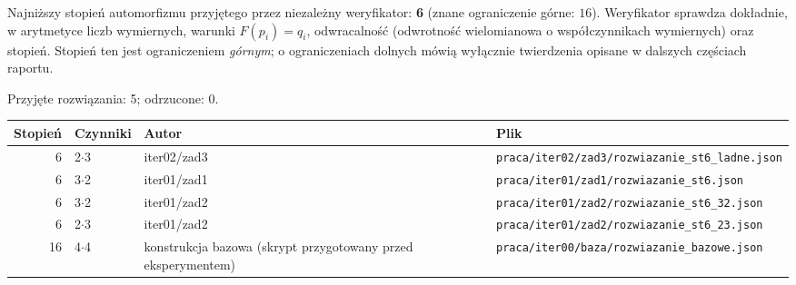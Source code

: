 Najniższy stopień automorfizmu przyjętego przez niezależny weryfikator: \textbf{6} (znane ograniczenie górne: $16$). Weryfikator sprawdza dokładnie, w arytmetyce liczb wymiernych, warunki $F(p_i)=q_i$, odwracalność (odwrotność wielomianowa o współczynnikach wymiernych) oraz stopień. Stopień ten jest ograniczeniem \emph{górnym}; o ograniczeniach dolnych mówią wyłącznie twierdzenia opisane w dalszych częściach raportu.

Przyjęte rozwiązania: 5; odrzucone: 0.
\begin{center}\small\begin{tabular}{rlp{5.2cm}p{5.6cm}}\toprule Stopień & Czynniki & Autor & Plik\\\midrule
6 & 2$\cdot$3 & iter02/zad3 & \texttt{praca/\allowbreak{}iter02/\allowbreak{}zad3/\allowbreak{}rozwiazanie\_st6\_ladne.json}\\
6 & 3$\cdot$2 & iter01/zad1 & \texttt{praca/\allowbreak{}iter01/\allowbreak{}zad1/\allowbreak{}rozwiazanie\_st6.json}\\
6 & 3$\cdot$2 & iter01/zad2 & \texttt{praca/\allowbreak{}iter01/\allowbreak{}zad2/\allowbreak{}rozwiazanie\_st6\_32.json}\\
6 & 2$\cdot$3 & iter01/zad2 & \texttt{praca/\allowbreak{}iter01/\allowbreak{}zad2/\allowbreak{}rozwiazanie\_st6\_23.json}\\
16 & 4$\cdot$4 & konstrukcja bazowa (skrypt przygotowany przed eksperymentem) & \texttt{praca/\allowbreak{}iter00/\allowbreak{}baza/\allowbreak{}rozwiazanie\_bazowe.json}\\
\bottomrule\end{tabular}\end{center}
